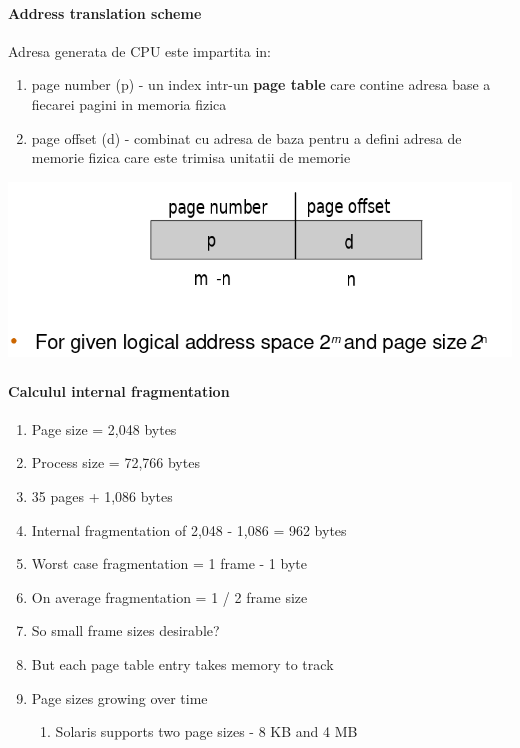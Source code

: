 \documentclass{article}
\begin{document}
\paragraph*{Address translation scheme}
Adresa generata de CPU este impartita in:
\begin{enumerate}
    \item page number (p) - un index intr-un \textbf{page table} care contine adresa base a fiecarei pagini in memoria fizica
    \item page offset (d) - combinat cu adresa de baza pentru a defini adresa de memorie fizica care este trimisa unitatii de memorie
\end{enumerate}

\begin{center}
    \includegraphics[scale=0.4]{19_pages.png}
\end{center}

\paragraph*{Calculul internal fragmentation}

\begin{enumerate}
    \item Page size = 2,048 bytes
    \item Process size = 72,766 bytes
    \item 35 pages + 1,086 bytes
    \item Internal fragmentation of 2,048 - 1,086 = 962 bytes
    \item Worst case fragmentation = 1 frame - 1 byte
    \item On average fragmentation = 1 / 2 frame size
    \item So small frame sizes desirable?
    \item But each page table entry takes memory to track
    \item Page sizes growing over time
          \begin{enumerate}
              \item Solaris supports two page sizes - 8 KB and 4 MB
          \end{enumerate}
\end{enumerate}
\end{document}
